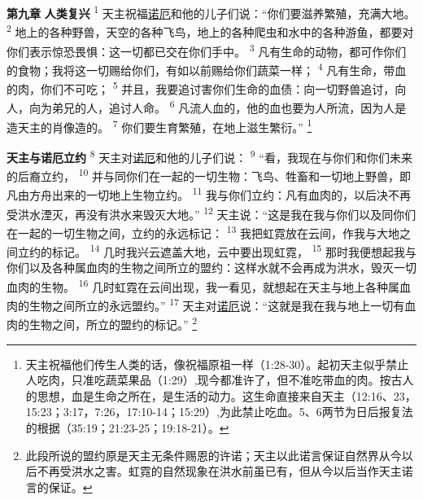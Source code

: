 \textbf{第九章 }
\textbf{人类复兴 }
\textsuperscript{1}
天主祝福\uline{诺厄}和他的儿子们说：“你们要滋养繁殖，充满大地。
\textsuperscript{2}
地上的各种野兽，天空的各种飞鸟，地上的各种爬虫和水中的各种游鱼，都要对你们表示惊恐畏惧：这一切都已交在你们手中。
\textsuperscript{3}
凡有生命的动物，都可作你们的食物；我将这一切赐给你们，有如以前赐给你们蔬菜一样；
\textsuperscript{4}
凡有生命，带血的肉，你们不可吃；
\textsuperscript{5}
并且，我要追讨害你们生命的血债：向一切野兽追讨，向人，向为弟兄的人，追讨人命。
\textsuperscript{6}
凡流人血的，他的血也要为人所流，因为人是造天主的肖像造的。
\textsuperscript{7}
你们要生育繁殖，在地上滋生繁衍。”
\footnote{天主祝福他们传生人类的话，像祝福原祖一样（1:28-30）。起初天主似乎禁止人吃肉，只准吃蔬菜果品（1:29）,现今都准许了，但不准吃带血的肉。按古人的思想，血是生命之所在，是生活的动力。这生命直接来自天主（12:16、23，15:23；3:17，7:26，17:10-14；15:29）,为此禁止吃血。5、6两节为日后报复法的根据（35:19；21:23-25；19:18-21）。}

\textbf{天主与诺厄立约 }
\textsuperscript{8}
天主对\uline{诺厄}和他的儿子们说：
\textsuperscript{9}
“看，我现在与你们和你们未来的后裔立约，
\textsuperscript{10}
并与同你们在一起的一切生物：飞鸟、牲畜和一切地上野兽，即凡由方舟出来的一切地上生物立约。
\textsuperscript{11}
我与你们立约：凡有血肉的，以后决不再受洪水湮灭，再没有洪水来毁灭大地。”
\textsuperscript{12}
天主说：“这是我在我与你们以及同你们在一起的一切生物之间，立约的永远标记：
\textsuperscript{13}
我把虹霓放在云间，作我与大地之间立约的标记。
\textsuperscript{14}
几时我兴云遮盖大地，云中要出现虹霓，
\textsuperscript{15}
那时我便想起我与你们以及各种属血肉的生物之间所立的盟约：这样水就不会再成为洪水，毁灭一切血肉的生物。
\textsuperscript{16}
几时虹霓在云间出现，我一看见，就想起在天主与地上各种属血肉的生物之间所立的永远盟约。”
\textsuperscript{17}
天主对\uline{诺厄}说：“这就是我在我与地上一切有血肉的生物之间，所立的盟约的标记。”
\footnote{此段所说的盟约原是天主无条件赐恩的许诺；天主以此诺言保证自然界从今以后不再受洪水之害。虹霓的自然现象在洪水前虽已有，但从今以后当作天主诺言的保证。}

